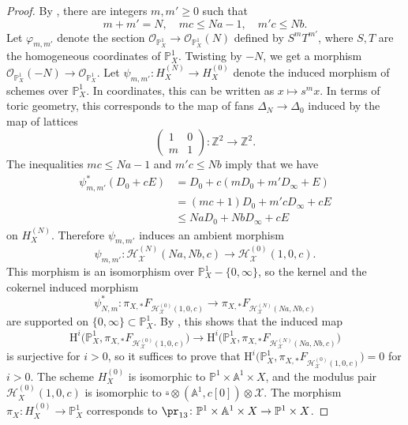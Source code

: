\documentclass{amsart}
\theoremstyle{plain}
\theoremstyle{definition}
\theoremstyle{remark}
\numberwithin{equation}{section}
\def\bcube{{\overline{\square}}}
\begin{document}
\begin{proof}
        By , there are integers $m,m'\geq 0$ such that
	$$
		m+m'=N,\quad mc \leq Na-1,\quad m'c\leq Nb.
	$$
        Let $\varphi_{m,m'}$ denote the section $\mathcal{O}_{\mathbb{P}^1_X}\to \mathcal{O}_{\mathbb{P}^1_X}(N)$ defined by $S^mT^{m'}$, where $S,T$ are the homogeneous coordinates of $\mathbb{P}^1_X$.
        Twisting by $-N$, we get a morphism $\mathcal{O}_{\mathbb{P}^1_X}(-N)\to \mathcal{O}_{\mathbb{P}^1_X}$.
	Let $\psi_{m,m'}\colon H^{(N)}_X\to H^{(0)}_X$ denote the induced morphism of schemes over $\mathbb{P}^1_X$.
    In coordinates, this can be written as $x\mapsto s^mx$.
    In terms of toric geometry, this corresponds to the map of fans $\Delta_N\to \Delta_0$ induced by the map of lattices
    $$
        \begin{pmatrix}1&0\\m&1\end{pmatrix}\colon \mathbb{Z}^2\to \mathbb{Z}^2.
    $$
    The inequalities $mc \leq Na-1$ and $m'c\leq Nb$ imply that we have
    \begin{align*}
        \psi_{m,m'}^*(D_0+cE)& = D_0 + c (mD_0 + m'D_\infty + E)\\
        &=(mc+1)D_0+m'cD_\infty + cE\\
        &\leq NaD_0+NbD_\infty+cE
    \end{align*}
    on $H^{(N)}_X$.
    Therefore $\psi_{m,m'}$ induces an ambient morphism
    $$
        \psi_{m,m'}\colon \mathcal{H}_\mathcal{X}^{(N)}(Na,Nb,c)\to \mathcal{H}^{(0)}_\mathcal{X}(1,0,c).
    $$
    This morphism is an isomorphism over $\mathbb{P}^1_X-\{0,\infty\}$, so the kernel and the cokernel induced morphism
    $$
    \psi_{N,m}^*\colon \pi_{X,*}F_{\mathcal{H}_\mathcal{X}^{(0)}(1,0,c)} \to \pi_{X,*}F_{\mathcal{H}_\mathcal{X}^{(N)}(Na,Nb,c)}
    $$
    are supported on $\{0,\infty\}\subset\mathbb{P}^1_X$.
    By , this shows that the induced map
    $$
        \mathrm{H}^i\bigl(\mathbb{P}^1_X, \pi_{X,*}F_{\mathcal{H}_\mathcal{X}^{(0)}(1,0,c)}\bigr)\to
        \mathrm{H}^i\bigl(\mathbb{P}^1_X, \pi_{X,*}F_{\mathcal{H}_\mathcal{X}^{(N)}(Na,Nb,c)}\bigr)
    $$
    is surjective for $i>0$, so it suffices to prove that $\mathrm{H}^i\bigl(\mathbb{P}^1_X, \pi_{X,*}F_{\mathcal{H}_\mathcal{X}^{(0)}(1,0,c)}\bigr)=0$ for $i>0$.
    The scheme $H_X^{(0)}$ is isomorphic to $\mathbb{P}^1\times \mathbb{A}^1\times X$, and the modulus pair $\mathcal{H}_X^{(0)}(1,0,c)$ is isomorphic to $\bcube \otimes (\mathbb{A}^1,c[0])\otimes\mathcal{X}$.
    The morphism $\pi_X\colon H_X^{(0)}\to \mathbb{P}^1_X$ corresponds to $\pr_{13}\colon \mathbb{P}^1\times \mathbb{A}^1\times X\to \mathbb{P}^1\times X$.

\end{proof}
\end{document}
